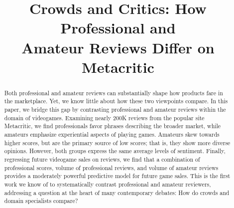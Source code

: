 \documentclass{sig-alternate}
\begin{document}
\skip{}\bigskipamount     %
\renewcommand*{\footnoterule}{
  \kern-3pt
  \hrule width 2in
  \kern 2.6pt
  \vspace{\smallskipamount}       %
}
\renewcommand\arraystretch{1.3}

\makeatletter
\def\url@leostyle{%
  \@ifundefined{selectfont}{\def\UrlFont{\sf}}{\def\UrlFont{\small\ttfamily}}}
\makeatother



\markright{\today}


\title{Crowds and Critics: How Professional and \\ [0.5ex]Amateur Reviews
Differ on Metacritic}
\author{
}
\maketitle

\begin{abstract}
Both professional and amateur reviews can substantially shape how products fare in the marketplace.
Yet, we know little about how these two viewpoints compare. 
In this paper, we bridge this gap by contrasting professional and amateur reviews within the domain of videogames. 
Examining nearly 200K reviews from the popular site Metacritic, we find professionals favor phrases describing the broader market, while amateurs emphasize experiential aspects of playing games. 
Amateurs skew towards higher scores, but are the primary source of low scores; that is, they show more diverse opinions.%
However, both groups express the same average levels of sentiment.
Finally, regressing future videogame sales on reviews, we find that a combination of professional scores, volume of professional reviews, and volume of amateur reviews provides a moderately powerful predictive model for future game sales. 
This is the first work we know of to systematically contrast professional and amateur reviewers, addressing a question at the heart of many contemporary debates: How do crowds and domain specialists compare?

\end{abstract}
\end{document}
